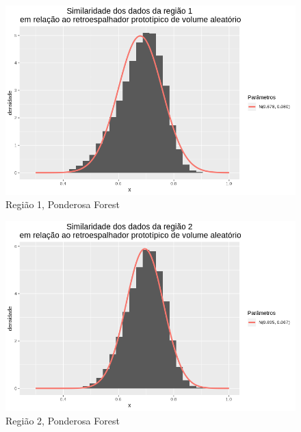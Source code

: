 \documentclass[12pt]{article}
\begin{document}
\begin{figure}[!h]
    \centering
    \includegraphics[width = 0.95\linewidth]{../../Images/Report_18_12_20/ponder_rv_region1.png}
    \caption{Região 1, Ponderosa Forest}
    \label{fig:pond_rv_r1}
\end{figure}

\begin{figure}[!h]
    \centering
    \includegraphics[width = 0.95\linewidth]{../../Images/Report_18_12_20/ponder_rv_region2.png}
    \caption{Região 2, Ponderosa Forest}
    \label{fig:pond_rv_r2}
\end{figure}
\end{document}

